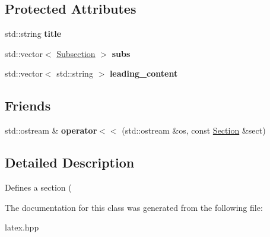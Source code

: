 \subsection*{\-Protected \-Attributes}
\begin{DoxyCompactItemize}
\item 
\hypertarget{classlatex_1_1doc_1_1Section_af6e7088b15a34c0faf4f60fd97f8a8d6}{std\-::string {\bfseries title}}\label{classlatex_1_1doc_1_1Section_af6e7088b15a34c0faf4f60fd97f8a8d6}

\item 
\hypertarget{classlatex_1_1doc_1_1Section_a0a8b071155892bf86e5e60243b58666b}{std\-::vector$<$ \hyperlink{classlatex_1_1doc_1_1Subsection}{\-Subsection} $>$ {\bfseries subs}}\label{classlatex_1_1doc_1_1Section_a0a8b071155892bf86e5e60243b58666b}

\item 
\hypertarget{classlatex_1_1doc_1_1Section_a91474f637298d07905279379ff8a36e1}{std\-::vector$<$ std\-::string $>$ {\bfseries leading\-\_\-content}}\label{classlatex_1_1doc_1_1Section_a91474f637298d07905279379ff8a36e1}

\end{DoxyCompactItemize}
\subsection*{\-Friends}
\begin{DoxyCompactItemize}
\item 
\hypertarget{classlatex_1_1doc_1_1Section_a8326770a980114dff62ba317662cb7a9}{std\-::ostream \& {\bfseries operator$<$$<$} (std\-::ostream \&os, const \hyperlink{classlatex_1_1doc_1_1Section}{\-Section} \&sect)}\label{classlatex_1_1doc_1_1Section_a8326770a980114dff62ba317662cb7a9}

\end{DoxyCompactItemize}


\subsection{\-Detailed \-Description}
\-Defines a section ( 

\-The documentation for this class was generated from the following file\-:\begin{DoxyCompactItemize}
\item 
latex.\-hpp\end{DoxyCompactItemize}
